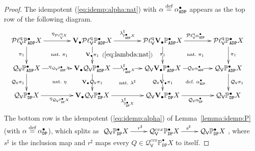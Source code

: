 \documentclass[preprint,12pt]{elsarticle}
\newcommand\eqdef{\mathrel{\buildrel \text{def}\over=}}
\newcommand\Pred{\mathbb{P}}
\newcommand\Angel{{\mathtt{A}}}
\newcommand\Demon{{\mathtt{D}}}
\newcommand\Nature{{\mathtt{P}}}
\newcommand\DN{{\Demon\Nature}}
\newcommand\ADN{{\Angel\Demon\Nature}}
\newcommand\Smyth{{\mathcal Q}}
\newcommand\Vt{\mathsf{V}}
\newcommand\SV{\Smyth_{\Vt}}
\newcommand\quasi{\mathrm{q}} %
\newcommand\QL{\Plotkin^\quasi}
\newcommand\QLV{\QL_\Vt}
\newcommand\Plotkin{\mathcal P\ell} %
\newcommand\Val{{\mathbf V}}
\begin{document}
\begin{proof}
  The idempotent (\ref{eq:idemp:alpha:nat}) with
  $\alpha \eqdef \alpha_\ADN^\bullet$ appears as the top row of the
  following diagram.
  \[
    \xymatrix@C+15pt{
      \QLV {\Pred_\ADN^\bullet X} \ar[r]^{\eta_{\QLV X}}
      \ar[d]_{\pi_1}
      \ar@{}[rd]|{\text{nat.\ $\pi_1$}}
      & \Val_\bullet {\QLV {\Pred_\ADN^\bullet X}}
      \ar[r]^{\lambda^\natural_{\Pred_\ADN^\bullet X}}
      \ar[d]|{\Val_\bullet {\pi_1}}
      \ar@{}[rd]|{(\ref{eq:lambda:nat})}
      & \QLV {\Val_\bullet {\Pred_\ADN^\bullet X}}
      \ar[r]^{\QLV {\alpha_\ADN^\bullet}}
      \ar[d]|{\pi_1}
      \ar@{}[rd]|{\text{nat.\ $\pi_1$}}
      & \QLV {\Pred_\ADN^\bullet X}
      \ar[d]^{\pi_1}
      \\
      \SV {\Pred_\ADN^\bullet X}
      \ar[r]|{\eta_{\SV {\Pred_\ADN^\bullet X}}}
      \ar[d]_{\SV {\pi_1}}
      \ar@{}[rd]|{\text{nat.\ $\eta$}}
      &
      \Val_\bullet {\SV {\Pred_\ADN^\bullet X}}
      \ar[r]|{\lambda^\sharp_{\Pred_\ADN^\bullet X}}
      \ar[d]|{\Val_\bullet {\SV {\pi_1}}}
      \ar@{}[rd]|{\text{nat.\ $\lambda^\sharp$}}
      &
      \SV {\Val_\bullet {\Pred_\ADN^\bullet X}}
      \ar[r]|{\SV {\alpha_\ADN^\bullet}}
      \ar[d]|{\SV {\Val_\bullet {\pi_1}}}
      \ar@{}[rd]|{\text{def.\ $\alpha_\ADN^\bullet$}}
      &
      \SV {\Pred_\ADN^\bullet X}
      \ar[d]^{\SV {\pi_1}}
      \\
      \SV {\Pred_\DN^\bullet X}
      \ar[r]_{\eta_{\SV {\Pred_\DN^\bullet X}}}
      &
      \Val_\bullet {\SV {\Pred_\DN^\bullet X}}
      \ar[r]_{\lambda^\sharp_{\Pred_\DN^\bullet X}}
      &
      \SV {\Val_\bullet {\Pred_\DN^\bullet X}}
      \ar[r]_{\SV {\alpha_\DN^\bullet}}
      &
      \SV {\Pred_\DN^\bullet X}
    }
  \]
  The bottom row is the idempotent (\ref{eq:idemp:alpha}) of
  Lemma~\ref{lemma:idemp:P} (with $\alpha \eqdef \alpha_\DN^\bullet$),
  which splits as
  $\xymatrix{\SV {\Pred_\DN^\bullet X} \ar[r]^{r^\sharp} & \SV^{cvx}
    {\Pred_\DN^\bullet X} \ar[r]^{s^\sharp} & \SV {\Pred_\DN^\bullet
      X}}$, where $s^\sharp$ is the inclusion map and $r^\sharp$ maps
  every $Q \in \SV^{cvx} {\Pred_\DN^\bullet X}$ to itself.


\end{proof}
\end{document}
